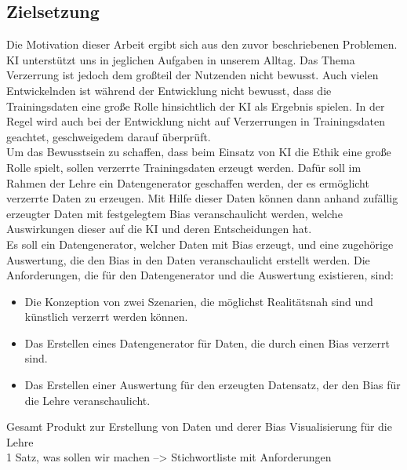 \begin{onehalfspace}
        \section{Zielsetzung}
        \label{subsec:zielsetzung}
        Die Motivation dieser Arbeit ergibt sich aus den zuvor beschriebenen Problemen. \ac*{KI} unterstützt uns in jeglichen Aufgaben in unserem Alltag. Das Thema Verzerrung ist jedoch dem großteil der Nutzenden nicht bewusst. Auch vielen Entwickelnden ist während der Entwicklung nicht bewusst, dass die Trainingsdaten eine große Rolle hinsichtlich der \ac*{KI} als Ergebnis spielen. In der Regel wird auch bei der Entwicklung nicht auf Verzerrungen in Trainingsdaten geachtet, geschweigedem darauf überprüft. 
        \\
        Um das Bewusstsein zu schaffen, dass beim Einsatz von \ac*{KI} die Ethik eine große Rolle spielt, sollen verzerrte Trainingsdaten erzeugt werden. Dafür soll im Rahmen der Lehre ein Datengenerator geschaffen werden, der es ermöglicht verzerrte Daten zu erzeugen. Mit Hilfe dieser Daten können dann anhand zufällig erzeugter Daten mit festgelegtem Bias veranschaulicht werden, welche Auswirkungen dieser auf die \ac*{KI} und deren Entscheidungen hat. 
        \\
        Es soll ein Datengenerator, welcher Daten mit Bias erzeugt, und eine zugehörige Auswertung, die den Bias in den Daten veranschaulicht erstellt werden. Die Anforderungen, die für den Datengenerator und die Auswertung existieren, sind:
        \begin{itemize}
            \item Die Konzeption von zwei Szenarien, die möglichst Realitätsnah sind und künstlich verzerrt werden können.
            \item Das Erstellen eines Datengenerator für Daten, die durch einen Bias verzerrt sind.
            \item Das Erstellen einer Auswertung für den erzeugten Datensatz, der den Bias für die Lehre veranschaulicht.
        \end{itemize}

        Gesamt Produkt zur Erstellung von Daten und derer Bias Visualisierung für die Lehre \\
        1 Satz, was sollen wir machen --> Stichwortliste mit Anforderungen \\


\end{onehalfspace}
